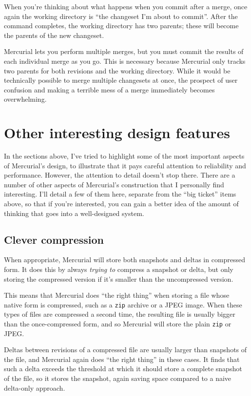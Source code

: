 When you're thinking about what happens when you commit after a merge,
once again the working directory is ``the changeset I'm about to
commit''.  After the  command completes, the working
directory has two parents; these will become the parents of the new
changeset.

Mercurial lets you perform multiple merges, but you must commit the
results of each individual merge as you go.  This is necessary because
Mercurial only tracks two parents for both revisions and the working
directory.  While it would be technically possible to merge multiple
changesets at once, the prospect of user confusion and making a
terrible mess of a merge immediately becomes overwhelming.

\section{Other interesting design features}

In the sections above, I've tried to highlight some of the most
important aspects of Mercurial's design, to illustrate that it pays
careful attention to reliability and performance.  However, the
attention to detail doesn't stop there.  There are a number of other
aspects of Mercurial's construction that I personally find
interesting.  I'll detail a few of them here, separate from the ``big
ticket'' items above, so that if you're interested, you can gain a
better idea of the amount of thinking that goes into a well-designed
system.

\subsection{Clever compression}

When appropriate, Mercurial will store both snapshots and deltas in
compressed form.  It does this by always \emph{trying to} compress a
snapshot or delta, but only storing the compressed version if it's
smaller than the uncompressed version.

This means that Mercurial does ``the right thing'' when storing a file
whose native form is compressed, such as a \texttt{zip} archive or a
JPEG image.  When these types of files are compressed a second time,
the resulting file is usually bigger than the once-compressed form,
and so Mercurial will store the plain \texttt{zip} or JPEG.

Deltas between revisions of a compressed file are usually larger than
snapshots of the file, and Mercurial again does ``the right thing'' in
these cases.  It finds that such a delta exceeds the threshold at
which it should store a complete snapshot of the file, so it stores
the snapshot, again saving space compared to a naive delta-only
approach.

